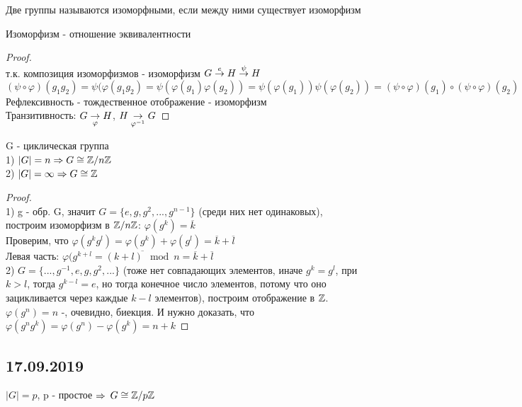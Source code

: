 \documentclass[12pt, fleqn]{article}
\begin{document}
\begin{definition}
    Две группы называются изоморфными, если между ними существует изоморфизм
\end{definition}

\begin{utv}
    Изоморфизм - отношение эквивалентности
\end{utv}

\begin{proof} \ \\
    т.к. композиция изоморфизмов - изоморфизм $G \overset{e}{\rightarrow} H \overset{\psi}{\rightarrow} H$\\
    $(\psi \circ \varphi)(g_1 g_2)= \psi(\varphi(g_1 g_2)=\psi(\varphi(g_1) \varphi(g_2))=\psi(\varphi(g_1)) \psi(\varphi(g_2)) = (\psi \circ \varphi)(g_1) \circ (\psi \circ \varphi)(g_2)$\\
    Рефлексивность - тождественное отображение - изоморфизм\\
    Транзитивность: $G \underset{\varphi}{\rightarrow} H$, $H \underset{\varphi^{-1}}{\rightarrow} G$
\end{proof}

\begin{theorem}
    G - циклическая группа\\
    1) $|G|=n \Rightarrow G \cong \mathbb{Z} / n \mathbb{Z}$\\
    2) $|G|=\infty \Rightarrow G \cong \mathbb{Z}$
\end{theorem}

\begin{proof}\\
    1) g - обр. G, значит $G=\{e,g,g^2,...,g^{n-1}\}$ (среди них нет одинаковых), построим изоморфизм в $\mathbb{Z} / n \mathbb{Z}$: $\varphi(g^k)=\overline{k}$\\
    Проверим, что $\varphi(g^k g^l)= \varphi(g^k)+\varphi(g^l)=\overline{k}+\overline{l}$\\
    Левая часть: $\varphi(g^{k+l}=\overline{(k+l) \mod n} = \overline{k}+\overline{l}$\\
    2) $G=\{...,g^{-1},e,g,g^2,...\}$ (тоже нет совпадающих элементов, иначе $g^k=g^l$, при $k>l$, тогда $g^{k-l}=e$, но тогда конечное число элементов, потому что оно зацикливается через каждые $k-l$ элементов), построим отображение в $\mathbb{Z}$.\\
    $\varphi(g^n)=n$ -, очевидно, биекция. И нужно доказать, что $\varphi(g^n g^k)=\varphi(g^n)-\varphi(g^k)=n+k$
\end{proof}

\subsection{17.09.2019}
\begin{utv}
    $|G|=p$, p - простое $\Rightarrow$ $G \cong \mathbb{Z} /p \mathbb{Z}$
\end{utv}
\end{document}
